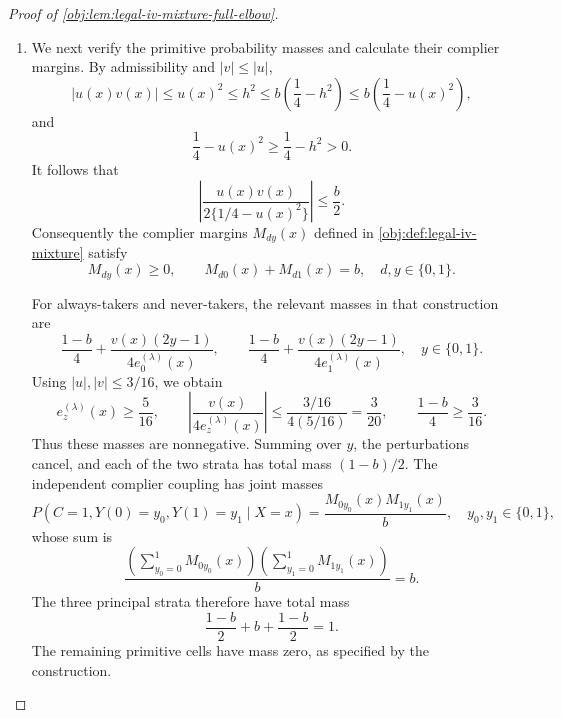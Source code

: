 \begin{proof}[Proof of \cref{obj:lem:legal-iv-mixture-full-elbow}]
\begin{enumerate}
The baseline cells of \cref{obj:synth_15} and finite summation in
\cref{obj:def:legal-iv-mixture} give the exact arm means
\[
m_{Dz}(x)=r_z^{(b)}=\frac{1+(2z-1)b}{2},
\qquad
m_{Yz}(x)=
\frac12+\frac{\tau u(x)}{1+2(2z-1)u(x)},
\quad z\in\{0,1\}.
\]
The receipt means are constant and belong to \([3/8,5/8]\). For the outcome means, the denominator satisfies
\[
1+2(2z-1)u(x)\ge1-\frac2{100}=\frac{49}{50}.
\]
Subtracting the two rational expressions gives
\[
m_{Yz}(x)-m_{Yz}(x')
=
\frac{\tau\{u(x)-u(x')\}}
{\{1+2(2z-1)u(x)\}\{1+2(2z-1)u(x')\}}.
\]
Since \(|\tau|\le1\) and \((49/50)^2\ge1/2\),
\[
|m_{Yz}(x)-m_{Yz}(x')|
\le2|u(x)-u(x')|.
\]
Taking \(u(x')=0\) in the same rational comparison gives
\[
\left|m_{Yz}(x)-\frac12\right|
\le2|u(x)|\le\frac1{50},
\]
so the outcome means belong to \([12/25,13/25]\). Their Hölder seminorms satisfy
\[
[m_{Yz}]_{\beta}
\le2c_{\star}(1+2\pi)
\le6\pi c_{\star}
\le L-\frac34<L.
\]
Their supremum norms are at most \(13/25<L\). Thus all density, propensity, and arm-mean Hölder conditions hold, with the range conditions in
\cref{obj:ass:arm-means-holder}. The corresponding center functions are the constants
\[
f_{\mathrm S}=f_{\mathrm T}=1,\qquad
e=\frac12,\qquad
m_{Dz}=r_z^{(b)},\qquad
m_{Yz}=\frac12,
\]
and satisfy the same conditions.

\item
We next verify the primitive probability masses and calculate their complier margins. By admissibility and \(|v|\le|u|\),
\[
|u(x)v(x)|\le u(x)^2\le h^2
\le b\left(\frac14-h^2\right)
\le b\left(\frac14-u(x)^2\right),
\]
and
\[
\frac14-u(x)^2\ge\frac14-h^2>0.
\]
It follows that
\[
\left|
\frac{u(x)v(x)}
{2\{1/4-u(x)^2\}}
\right|\le\frac b2.
\]
Consequently the complier margins \(M_{dy}(x)\) defined in
\cref{obj:def:legal-iv-mixture} satisfy
\[
M_{dy}(x)\ge0,
\qquad
M_{d0}(x)+M_{d1}(x)=b,
\quad d,y\in\{0,1\}.
\]

For always-takers and never-takers, the relevant masses in that construction are
\[
\frac{1-b}{4}
+\frac{v(x)(2y-1)}{4e_0^{(\lambda)}(x)},
\qquad
\frac{1-b}{4}
+\frac{v(x)(2y-1)}{4e_1^{(\lambda)}(x)},
\quad y\in\{0,1\}.
\]
Using \(|u|,|v|\le3/16\), we obtain
\[
e_z^{(\lambda)}(x)\ge\frac5{16},
\qquad
\left|\frac{v(x)}{4e_z^{(\lambda)}(x)}\right|
\le\frac{3/16}{4(5/16)}=\frac3{20},
\qquad
\frac{1-b}{4}\ge\frac3{16}.
\]
Thus these masses are nonnegative. Summing over \(y\), the perturbations cancel, and each of the two strata has total mass \((1-b)/2\). The independent complier coupling has joint masses
\[
P(C=1,Y(0)=y_0,Y(1)=y_1\mid X=x)
=
\frac{M_{0y_0}(x)M_{1y_1}(x)}{b},
\quad y_0,y_1\in\{0,1\},
\]
whose sum is
\[
\frac{
\left(\sum_{y_0=0}^1M_{0y_0}(x)\right)
\left(\sum_{y_1=0}^1M_{1y_1}(x)\right)
}{b}
=b.
\]
The three principal strata therefore have total mass
\[
\frac{1-b}{2}+b+\frac{1-b}{2}=1.
\]
The remaining primitive cells have mass zero, as specified by the construction.


\end{enumerate}
\end{proof}
